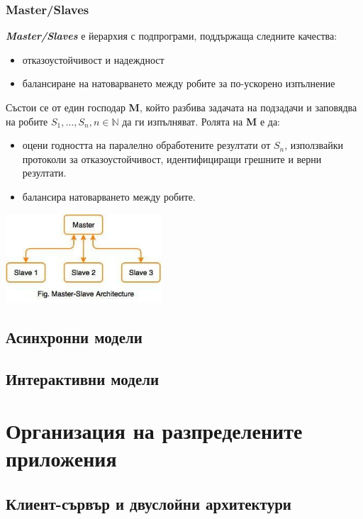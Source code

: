 \documentclass[fleqn,12pt]{article}
\begin{document}
\subsubsection{Master/Slaves}

\textbf{\textit{Master/Slaves}} е йерархия с подпрограми, поддържаща следните качества:
\begin{itemize}
    \item отказоустойчивост и надеждност
    \item балансиране на натоварването между робите за по-ускорено изпълнение
\end{itemize}

Състои се от един господар \textbf{M}, който разбива задачата на подзадачи и заповядва на робите $S_1, \dots, S_n, n \in \mathbb{N}$ да ги изпълняват.
Ролята на \textbf{M} е да:
\begin{itemize}
    \item оцени годността на паралелно обработените резултати от $S_n$, използвайки протоколи за отказоустойчивост, идентифициращи грешните и верни резултати.
    \item балансира натоварването между робите.
\end{itemize}

\begin{center} \includegraphics[width=220px]{master_slave.jpg} \end{center}


\subsection{Асинхронни модели}
\subsection{Интерактивни модели}

\section{Организация на разпределените приложения}

\subsection{Клиент-сървър и двуслойни архитектури}
\end{document}
